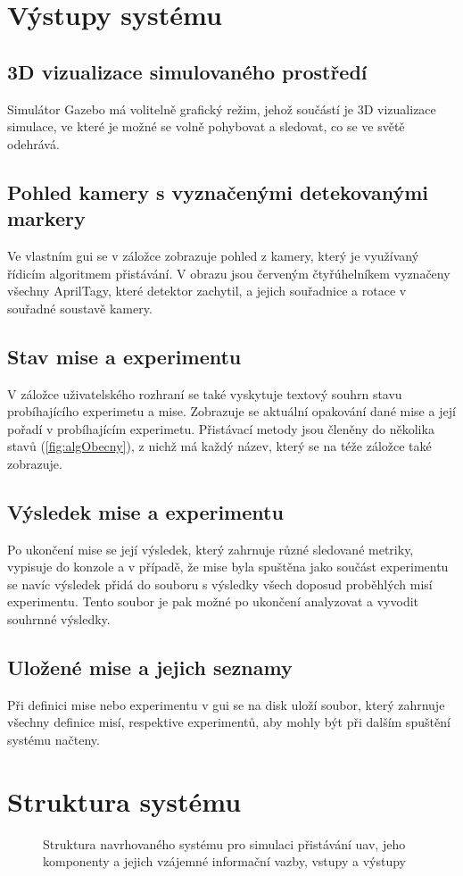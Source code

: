   \section{Výstupy systému} \label{sec:outputs}
    \subsection{3D vizualizace simulovaného prostředí}
      Simulátor Gazebo má volitelně grafický režim, jehož součástí je 3D vizualizace simulace, ve které je možné se volně pohybovat a sledovat, co se ve světě odehrává.
    \subsection{Pohled kamery s vyznačenými detekovanými markery}
      Ve vlastním \acrshort{gui} se v záložce  zobrazuje pohled z kamery, který je využívaný řídicím algoritmem přistávání. V obrazu jsou červeným čtyřúhelníkem vyznačeny všechny AprilTagy, které detektor zachytil, a jejich souřadnice a rotace v souřadné soustavě kamery.
    \subsection{Stav mise a experimentu}
      V záložce  uživatelského rozhraní se také vyskytuje textový souhrn stavu probíhajícího experimetu a mise. Zobrazuje se aktuální opakování dané mise a její pořadí v probíhajícím experimetu. Přistávací metody jsou členěny do několika stavů (\cref{fig:algObecny}), z nichž má každý název, který se na téže záložce také zobrazuje. %
    \subsection{Výsledek mise a experimentu}
      Po ukončení mise se její výsledek, který zahrnuje různé sledované metriky, %
      vypisuje do konzole a v případě, že mise byla spuštěna jako součást experimentu se navíc výsledek přidá do souboru s výsledky všech doposud proběhlých misí experimentu. Tento soubor je pak možné po ukončení analyzovat a vyvodit souhrnné výsledky.
    \subsection{Uložené mise a jejich seznamy}
      Při definici mise nebo experimentu v \acrshort{gui} se na disk uloží soubor, který zahrnuje všechny definice misí, respektive experimentů, aby mohly být při dalším spuštění systému načteny.
  \section{Struktura systému} \label{sec:structure}
    \begin{figure}
      \caption[Struktura navrhovaného systému]{Struktura navrhovaného systému pro simulaci přistávání \acrshort{uav}, jeho komponenty a jejich vzájemné informační vazby, vstupy a výstupy}
      \label{fig:sysStruktura}
    \end{figure}